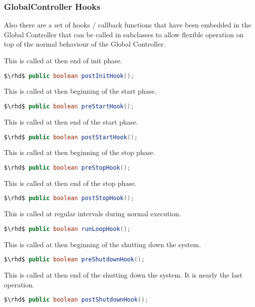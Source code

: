 \subsubsection{GlobalController Hooks}

Also there are a set of hooks / callback functions that have
been embedded in the Global Controller that can be called in
subclasses to allow flexible operation on top of the normal behaviour
of the Global Controller.


\noindent This is called at then end of init phase.
\begin{lstlisting}[language=Java]
    $\rhd$ public boolean postInitHook();
\end{lstlisting}

\noindent This is called at then beginning of the start phase.
\begin{lstlisting}[language=Java]
    $\rhd$ public boolean preStartHook();
\end{lstlisting}

\noindent This is called at then end of the start phase.
\begin{lstlisting}[language=Java]
    $\rhd$ public boolean postStartHook();
\end{lstlisting}

\noindent This is called at then beginning of the stop phase.
\begin{lstlisting}[language=Java]
    $\rhd$ public boolean preStopHook();
\end{lstlisting}

\noindent This is called at then end of the stop phase.
\begin{lstlisting}[language=Java]
    $\rhd$ public boolean postStopHook();
\end{lstlisting}

\noindent This is called at regular intervals during normal execution.
\begin{lstlisting}[language=Java]
    $\rhd$ public boolean runLoopHook();
\end{lstlisting}

\noindent This is called at then beginning of the shutting down the system.
\begin{lstlisting}[language=Java]
    $\rhd$ public boolean preShutdownHook();
\end{lstlisting}

\noindent This is called at then end of the shutting down the
system. It is nearly the last operation. 
\begin{lstlisting}[language=Java]
    $\rhd$ public boolean postShutdownHook();
\end{lstlisting}

